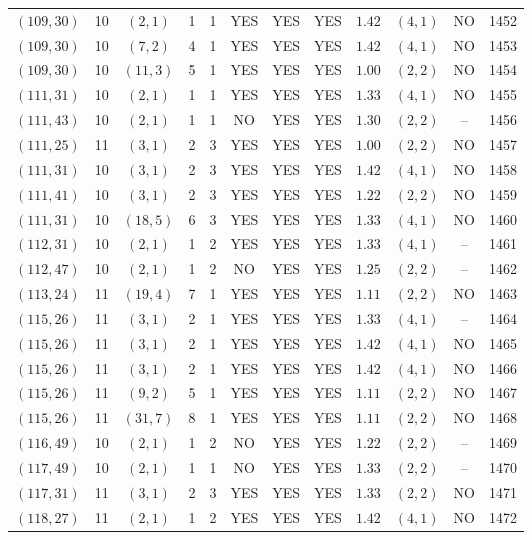 \begin{longtable}{|c|c|c|c|c|c|c|c|c|c|c|c|}
$(109,30)$ & 10 & $(2,1)$ & 1 & 1 & YES & YES & YES & $1.42$ & $(4,1)$ & NO & 1452\\
$(109,30)$ & 10 & $(7,2)$ & 4 & 1 & YES & YES & YES & $1.42$ & $(4,1)$ & NO & 1453\\
$(109,30)$ & 10 & $(11,3)$ & 5 & 1 & YES & YES & YES & $1.00$ & $(2,2)$ & NO & 1454\\
$(111,31)$ & 10 & $(2,1)$ & 1 & 1 & YES & YES & YES & $1.33$ & $(4,1)$ & NO & 1455\\
$(111,43)$ & 10 & $(2,1)$ & 1 & 1 & NO & YES & YES & $1.30$ & $(2,2)$ & -- & 1456\\
$(111,25)$ & 11 & $(3,1)$ & 2 & 3 & YES & YES & YES & $1.00$ & $(2,2)$ & NO & 1457\\
$(111,31)$ & 10 & $(3,1)$ & 2 & 3 & YES & YES & YES & $1.42$ & $(4,1)$ & NO & 1458\\
$(111,41)$ & 10 & $(3,1)$ & 2 & 3 & YES & YES & YES & $1.22$ & $(2,2)$ & NO & 1459\\
$(111,31)$ & 10 & $(18,5)$ & 6 & 3 & YES & YES & YES & $1.33$ & $(4,1)$ & NO & 1460\\
$(112,31)$ & 10 & $(2,1)$ & 1 & 2 & YES & YES & YES & $1.33$ & $(4,1)$ & -- & 1461\\
$(112,47)$ & 10 & $(2,1)$ & 1 & 2 & NO & YES & YES & $1.25$ & $(2,2)$ & -- & 1462\\
$(113,24)$ & 11 & $(19,4)$ & 7 & 1 & YES & YES & YES & $1.11$ & $(2,2)$ & NO & 1463\\
$(115,26)$ & 11 & $(3,1)$ & 2 & 1 & YES & YES & YES & $1.33$ & $(4,1)$ & -- & 1464\\
$(115,26)$ & 11 & $(3,1)$ & 2 & 1 & YES & YES & YES & $1.42$ & $(4,1)$ & NO & 1465\\
$(115,26)$ & 11 & $(3,1)$ & 2 & 1 & YES & YES & YES & $1.42$ & $(4,1)$ & NO & 1466\\
$(115,26)$ & 11 & $(9,2)$ & 5 & 1 & YES & YES & YES & $1.11$ & $(2,2)$ & NO & 1467\\
$(115,26)$ & 11 & $(31,7)$ & 8 & 1 & YES & YES & YES & $1.11$ & $(2,2)$ & NO & 1468\\
$(116,49)$ & 10 & $(2,1)$ & 1 & 2 & NO & YES & YES & $1.22$ & $(2,2)$ & -- & 1469\\
$(117,49)$ & 10 & $(2,1)$ & 1 & 1 & NO & YES & YES & $1.33$ & $(2,2)$ & -- & 1470\\
$(117,31)$ & 11 & $(3,1)$ & 2 & 3 & YES & YES & YES & $1.33$ & $(2,2)$ & NO & 1471\\
$(118,27)$ & 11 & $(2,1)$ & 1 & 2 & YES & YES & YES & $1.42$ & $(4,1)$ & NO & 1472\\

\end{longtable}
